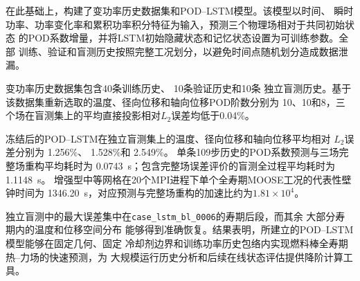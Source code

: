 在此基础上，构建了变功率历史数据集和POD--LSTM模型。该模型以时间、
瞬时功率、功率变化率和累积功率积分特征为输入，预测三个物理场相对于共同初始状态
的POD系数增量，并将LSTM初始隐藏状态和记忆状态设置为可训练参数。全部
训练、验证和盲测历史按照完整工况划分，以避免时间点随机划分造成数据泄漏。

变功率历史数据集包含40条训练历史、
10条验证历史和10条
独立盲测历史。基于该数据集重新选取的温度、径向位移和轴向位移POD阶数分别为
10、10和8，三个场在盲测集上的平均直接投影相对$L_2$误差均低于0.04\%。

冻结后的POD--LSTM在独立盲测集上的温度、径向位移和轴向位移平均相对
$L_2$误差分别为
1.256\%、
1.528\%和
2.549\%。
单条109步历史的POD系数预测与三场完整场重构平均耗时为
0.0743~s；包含完整场误差评价的盲测全过程平均耗时为1.1148~s。
增强型中等网格在20个MPI进程下单个全寿期MOOSE工况的代表性壁钟时间为
1346.20~s，对应预测与完整场重构的加速比约为$1.81\times10^4$。

独立盲测中的最大误差集中在\texttt{case\_lstm\_bl\_0006}的寿期后段，而其余
大部分寿期内的温度和位移空间分布
能够得到准确恢复。结果表明，所建立的POD--LSTM模型能够在固定几何、固定
冷却剂边界和训练功率历史包络内实现燃料棒全寿期热--力场的快速预测，为
大规模运行历史分析和后续在线状态评估提供降阶计算工具。
